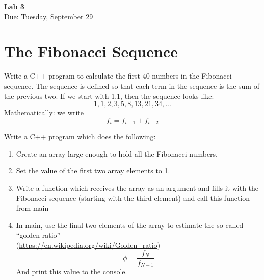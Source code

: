 \documentclass{article}
\begin{document}
\fancyfoot[C]{\thepage}
\vspace*{0cm}
\begin{center}
	{\LARGE \textbf{Lab 3}}\\
	\vspace{0.25cm}
	{\Large Due: Tuesday, September 29}
\end{center}

\section*{The Fibonacci Sequence}
Write a C++ program to calculate the first 40 numbers in the Fibonacci sequence. The sequence is defined so that each term in the sequence is the sum of the previous two. If we start with 1,1, then the sequence looks like:
\begin{equation*}
1, 1, 2, 3, 5, 8, 13, 21, 34, ...
\end{equation*}
Mathematically: we write 
\begin{equation*}
f_i = f_{i-1} + f_{i-2}
\end{equation*}

Write a C++ program which does the following:

\begin{enumerate}
\item Create an array large enough to hold all the Fibonacci numbers. 
\item Set the value of the first two array elements to 1. 
\item Write a function which receives the array as an argument and fills it with the Fibonacci sequence (starting with the third element) and call this function from main
\item In main, use the final two elements of the array to estimate the so-called ``golden ratio''\\
{\color{blue} (\href{https://en.wikipedia.org/wiki/Golden_ratio}{https://en.wikipedia.org/wiki/Golden\_ratio})
}
\begin{equation*}
\phi = \frac{f_N}{f_{N-1}}
\end{equation*}
And print this value to the console.
\end{enumerate}
\end{document}

